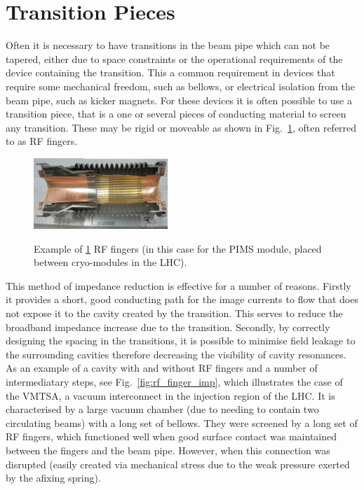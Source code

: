 \section{Transition Pieces}
\label{sec:transitions}

Often it is necessary to have transitions in the beam pipe which can not be tapered, either due to space constraints or the operational requirements of the device containing the transition. This a common requirement in devices that require some mechanical freedom, such as bellows, or electrical isolation from the beam pipe, such as kicker magnets. For these devices it is often possible to use a transition piece, that is a one or several pieces of conducting material to screen any transition. These may be rigid or moveable as shown in Fig.~\ref{fig:rf_fingers}, often referred to as RF fingers.

\begin{figure}
\begin{center}
\includegraphics[width=0.45\textwidth]{Beam_Coupling_Impedance_Reduction_Techniques/figures/pimsImage.png}
\label{fig:rf_fingers}
\end{center}
\caption{Example of \ref{fig:rf_fingers} RF fingers (in this case for the PIMS module, placed between cryo-modules in the LHC).}
\end{figure}


This method of impedance reduction is effective for a number of reasons. Firstly it provides a short, good conducting path for the image currents to flow that does not expose it to the cavity created by the transition. This serves to reduce the broadband impedance increase due to the transition. Secondly, by correctly designing the spacing in the transitions, it is possible to minimise field leakage to the surrounding cavities therefore decreasing the visibility of cavity resonances. As an example of a cavity with and without RF fingers and a number of intermediatary steps, see Fig.~\ref{fig:rf_finger_imp}, which illustrates the case of the VMTSA, a vacuum interconnect in the injection region of the LHC. It is characterised by a large vacuum chamber (due to needing to contain two circulating beams) with a long set of bellows. They were screened by a long set of RF fingers, which functioned well when good surface contact was maintained between the fingers and the beam pipe. However, when this connection was disrupted (easily created via mechanical stress due to the weak pressure exerted by the afixing spring).


